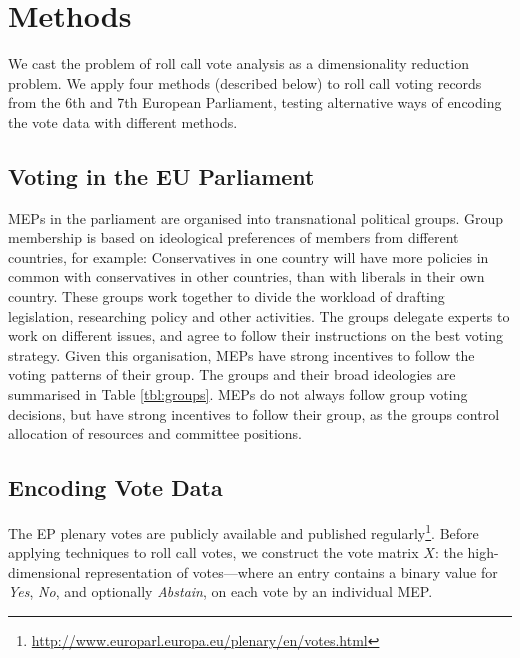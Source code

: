 \documentclass{llncs}
\begin{document}
\section{Methods}
\label{sec:methods}

We cast the problem of roll call vote analysis as a dimensionality reduction problem. We apply four methods (described below) to roll call voting records from the 6th and 7th European Parliament, testing alternative ways of encoding the vote data with different methods.

\subsection{Voting in the EU Parliament}
MEPs in the parliament are organised into transnational political groups. Group membership is based on ideological preferences of members from different countries, for example: Conservatives in one country will have more policies in common with conservatives in other countries, than with liberals in their own country. These groups work together to divide the workload of drafting legislation, researching policy and other activities. The groups delegate experts to work on different issues, and agree to follow their instructions on the best voting strategy. Given this organisation, MEPs have strong incentives to follow the voting patterns of their group\cite{Hix821}. The groups and their broad ideologies are summarised in Table \ref{tbl:groups}. MEPs do not always follow group voting decisions, but have strong incentives to follow their group, as the groups control allocation of resources and committee positions.

\subsection{Encoding Vote Data}

The EP plenary votes are publicly available and published regularly\footnote{\url{http://www.europarl.europa.eu/plenary/en/votes.html}}. Before applying techniques to roll call votes, we construct the vote matrix $X$: the high-dimensional representation of votes---where an entry contains a binary value for \emph{Yes}, \emph{No}, and optionally \emph{Abstain}, on each vote by an individual MEP. 
\end{document}
